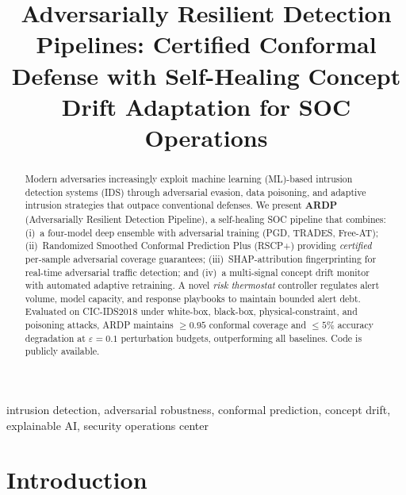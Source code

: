 \documentclass[conference]{IEEEtran}
\begin{document}
\title{Adversarially Resilient Detection Pipelines: Certified Conformal\\
Defense with Self-Healing Concept Drift Adaptation for SOC Operations}

\author{
}

\maketitle

\begin{abstract}
Modern adversaries increasingly exploit machine learning (ML)-based intrusion
detection systems (IDS) through adversarial evasion, data poisoning, and
adaptive intrusion strategies that outpace conventional defenses.
We present \textbf{ARDP} (Adversarially Resilient Detection Pipeline), a
self-healing SOC pipeline that combines: (i)~a four-model deep ensemble with
adversarial training (PGD, TRADES, Free-AT); (ii)~Randomized Smoothed
Conformal Prediction Plus (RSCP+) providing \emph{certified} per-sample
adversarial coverage guarantees; (iii)~SHAP-attribution fingerprinting for
real-time adversarial traffic detection; and (iv)~a multi-signal concept drift
monitor with automated adaptive retraining.
A novel \emph{risk thermostat} controller regulates alert volume, model
capacity, and response playbooks to maintain bounded alert debt.
Evaluated on CIC-IDS2018 under white-box, black-box, physical-constraint, and
poisoning attacks, ARDP maintains ${\ge}0.95$ conformal coverage and
${\le}5\%$ accuracy degradation at $\varepsilon{=}0.1$ perturbation budgets,
outperforming all baselines. Code is publicly available.
\end{abstract}

\begin{IEEEkeywords}
intrusion detection, adversarial robustness, conformal prediction,
concept drift, explainable AI, security operations center
\end{IEEEkeywords}

\section{Introduction}
\label{sec:intro}
\end{document}
